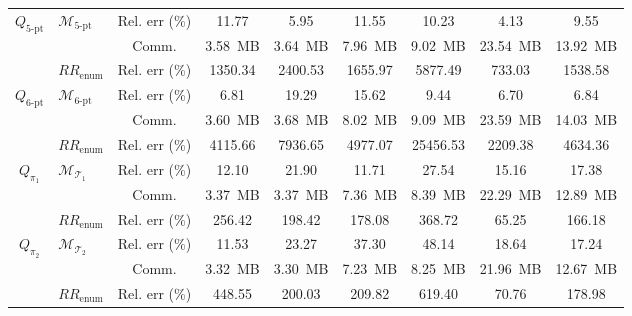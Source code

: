 \begin{table}[hbtp!]
\begin{threeparttable}
{\begin{tabular}{clccccccc}
\multirow[c]{3}{*}{$Q_{\mathrm{5\text{-}pt}}$}
& \multirow[c]{2}{*}{${\mathcal{M}}_{\mathrm{5\text{-}pt}}$}
& Rel. err (\%) & \cellcolor{gray!35}11.77 
& \cellcolor{gray!35}5.95 
& \cellcolor{gray!35}11.55 
& \cellcolor{gray!35}10.23 
& \cellcolor{gray!35}4.13 
& \cellcolor{gray!35}9.55 \\
& & Comm. & \cellcolor{gray!12}3.58~MB 
& \cellcolor{gray!12}3.64~MB 
& \cellcolor{gray!12}7.96~MB 
& \cellcolor{gray!12}9.02~MB 
& \cellcolor{gray!12}23.54~MB
& \cellcolor{gray!12}13.92~MB \\
\cmidrule(lr){2-9}
& \multirow[c]{1}{*}{$RR_{\text{enum}}$}
& Rel. err (\%) & 1350.34 & 2400.53 & 1655.97 & 5877.49 & 733.03 & 1538.58 \\
\midrule

\multirow[c]{3}{*}{{$Q_{\mathrm{6\text{-}pt}}$}}
& \multirow[c]{2}{*}{{${\mathcal{M}}_{\mathrm{6\text{-}pt}}$}}
& {Rel. err (\%)} 
& \cellcolor{gray!35} {6.81} 
& \cellcolor{gray!35} {19.29} 
& \cellcolor{gray!35} {15.62} 
& \cellcolor{gray!35} {9.44} 
& \cellcolor{gray!35} {6.70} 
& \cellcolor{gray!35} {6.84} \\
& & {Comm.} 
& \cellcolor{gray!12} {3.60~MB} 
& \cellcolor{gray!12} {3.68~MB} 
& \cellcolor{gray!12} {8.02~MB} 
& \cellcolor{gray!12} {9.09~MB} 
& \cellcolor{gray!12} {23.59~MB}
& \cellcolor{gray!12} {14.03~MB} \\
\cmidrule(lr){2-9}
& \multirow[c]{1}{*}{{$RR_{\text{enum}}$}}
& {Rel. err (\%)} 
& {4115.66} & {7936.65} & {4977.07} & {25456.53} & {2209.38} & {4634.36} \\
\midrule


\multirow[c]{3}{*}{$Q_{\pi_1}$}
& \multirow[c]{2}{*}{$\mathcal{M}_{\mathcal{T}_1}$}
& Rel. err (\%) & \cellcolor{gray!35}12.10 & \cellcolor{gray!35}21.90 & \cellcolor{gray!35}11.71 & \cellcolor{gray!35}27.54 & \cellcolor{gray!35}15.16 & \cellcolor{gray!35}17.38 \\
& & Comm. & \cellcolor{gray!12}3.37~MB & \cellcolor{gray!12}3.37~MB & \cellcolor{gray!12}7.36~MB & \cellcolor{gray!12}8.39~MB & \cellcolor{gray!12}22.29~MB & \cellcolor{gray!12}12.89~MB \\
\cmidrule(lr){2-9}
& \multirow[c]{1}{*}{$RR_{\text{enum}}$}
& Rel. err (\%) & 256.42 & 198.42 & 178.08 & 368.72 & 65.25 & 166.18 \\
\midrule

\multirow[c]{3}{*}{$Q_{\pi_2}$}
& \multirow[c]{2}{*}{$\mathcal{M}_{\mathcal{T}_2}$}
& Rel. err (\%) & \cellcolor{gray!35}11.53 & \cellcolor{gray!35}23.27 & \cellcolor{gray!35}37.30 & \cellcolor{gray!35}48.14 & \cellcolor{gray!35}18.64 & \cellcolor{gray!35}17.24 \\
& & Comm. & \cellcolor{gray!12}3.32~MB & \cellcolor{gray!12}3.30~MB & \cellcolor{gray!12}7.23~MB & \cellcolor{gray!12}8.25~MB & \cellcolor{gray!12}21.96~MB & \cellcolor{gray!12}12.67~MB \\
\cmidrule(lr){2-9}
& \multirow[c]{1}{*}{$RR_{\text{enum}}$}
& Rel. err (\%) & 448.55 & 200.03 & 209.82 & 619.40 & 70.76 & 178.98 \\


\end{tabular}}
\end{threeparttable}
\end{table}
